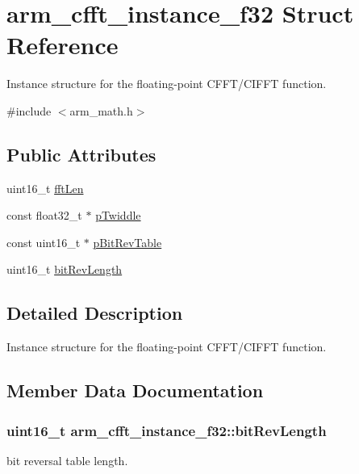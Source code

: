 \hypertarget{structarm__cfft__instance__f32}{}\section{arm\+\_\+cfft\+\_\+instance\+\_\+f32 Struct Reference}
\label{structarm__cfft__instance__f32}


Instance structure for the floating-\/point C\+F\+F\+T/\+C\+I\+F\+FT function.  




{\ttfamily \#include $<$arm\+\_\+math.\+h$>$}

\subsection*{Public Attributes}
\begin{DoxyCompactItemize}
\item 
uint16\+\_\+t \hyperlink{structarm__cfft__instance__f32_acd8f9e9540e3dd348212726e5d6aaa95}{fft\+Len}
\item 
const float32\+\_\+t $\ast$ \hyperlink{structarm__cfft__instance__f32_a59cc6f753f1498716e1444ac054c06de}{p\+Twiddle}
\item 
const uint16\+\_\+t $\ast$ \hyperlink{structarm__cfft__instance__f32_a21ceaf59a1bb8440af57c28d2dd9bbab}{p\+Bit\+Rev\+Table}
\item 
uint16\+\_\+t \hyperlink{structarm__cfft__instance__f32_a3ba329ed153d182746376208e773d648}{bit\+Rev\+Length}
\end{DoxyCompactItemize}


\subsection{Detailed Description}
Instance structure for the floating-\/point C\+F\+F\+T/\+C\+I\+F\+FT function. 

\subsection{Member Data Documentation}
\subsubsection[{\texorpdfstring{bit\+Rev\+Length}{bitRevLength}}]{\setlength{\rightskip}{0pt plus 5cm}uint16\+\_\+t arm\+\_\+cfft\+\_\+instance\+\_\+f32\+::bit\+Rev\+Length}\hypertarget{structarm__cfft__instance__f32_a3ba329ed153d182746376208e773d648}{}\label{structarm__cfft__instance__f32_a3ba329ed153d182746376208e773d648}
bit reversal table length. 
